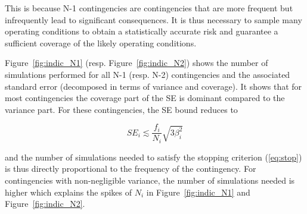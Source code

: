 This is because N-1 contingencies are contingencies that are more frequent but infrequently lead to significant consequences. It is thus necessary to sample many operating conditions to obtain a statistically accurate risk and guarantee a sufficient coverage of the likely operating conditions.

Figure~\ref{fig:indic_N1} (resp. Figure~\ref{fig:indic_N2}) shows the number of simulations performed for all N-1 (resp. N-2) contingencies and the associated standard error (decomposed in terms of variance and coverage). It shows that for most contingencies the coverage part of the SE is dominant compared to the variance part. For these contingencies, the SE bound reduces to

\begin{equation}
  SE_i \lesssim \frac{f_i}{N_i} \sqrt{3 \beta_i^2}
\end{equation}

\noindent and the number of simulations needed to satisfy the stopping criterion (\ref{eq:stop}) is thus directly proportional to the frequency of the contingency. For contingencies with non-negligible variance, the number of simulations needed is higher which explains the spikes of \(N_i\) in Figure~\ref{fig:indic_N1} and Figure~\ref{fig:indic_N2}.


